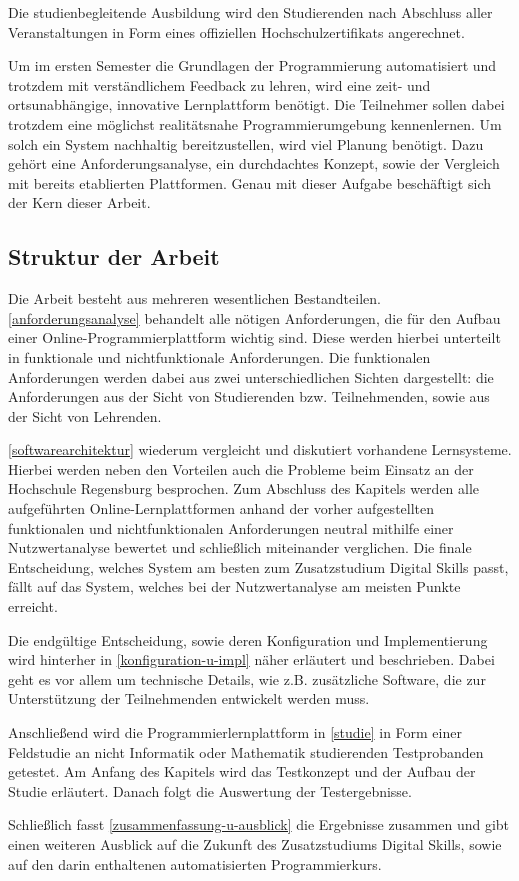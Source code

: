 \newpage

Die studienbegleitende Ausbildung wird den Studierenden nach Abschluss aller
Veranstaltungen in Form eines offiziellen Hochschulzertifikats angerechnet.

Um im ersten Semester die Grundlagen der Programmierung automatisiert und
trotzdem mit verständlichem Feedback zu lehren, wird eine zeit- und
ortsunabhängige, innovative Lernplattform benötigt. Die Teilnehmer sollen dabei
trotzdem eine möglichst realitätsnahe Programmierumgebung kennenlernen. Um solch
ein System nachhaltig bereitzustellen, wird viel Planung benötigt. Dazu gehört
eine Anforderungsanalyse, ein durchdachtes Konzept, sowie der Vergleich
mit bereits etablierten Plattformen. Genau mit dieser Aufgabe beschäftigt sich
der Kern dieser Arbeit.

\subsection{Struktur der Arbeit}\label{struktur-der-arbeit}
Die Arbeit besteht aus mehreren wesentlichen Bestandteilen.
\autoref{anforderungsanalyse} behandelt alle nötigen Anforderungen, die für den
Aufbau einer Online-Programmierplattform wichtig sind. Diese werden hierbei
unterteilt in funktionale und nichtfunktionale Anforderungen. Die funktionalen
Anforderungen werden dabei aus zwei unterschiedlichen Sichten dargestellt: die
Anforderungen aus der Sicht von Studierenden bzw. Teilnehmenden, sowie aus der
Sicht von Lehrenden.

\autoref{softwarearchitektur} wiederum vergleicht und diskutiert vorhandene
Lernsysteme. Hierbei werden neben den Vorteilen auch die Probleme beim Einsatz
an der Hochschule Regensburg besprochen. Zum Abschluss des Kapitels werden alle
aufgeführten Online-Lernplattformen anhand der vorher aufgestellten funktionalen
und nichtfunktionalen Anforderungen neutral mithilfe einer Nutzwertanalyse
bewertet und schließlich miteinander verglichen. Die finale Entscheidung,
welches System am besten zum Zusatzstudium Digital Skills passt, fällt auf das
System, welches bei der Nutzwertanalyse am meisten Punkte erreicht.

Die endgültige Entscheidung, sowie deren Konfiguration und Implementierung wird
hinterher in \autoref{konfiguration-u-impl} näher erläutert und beschrieben.
Dabei geht es vor allem um technische Details, wie z.B. zusätzliche Software,
die zur Unterstützung der Teilnehmenden entwickelt werden muss.

Anschließend wird die Programmierlernplattform in \autoref{studie} in Form
einer Feldstudie an nicht Informatik oder Mathematik studierenden Testprobanden
getestet. Am Anfang des Kapitels wird das Testkonzept und der Aufbau der Studie
erläutert. Danach folgt die Auswertung der Testergebnisse.

Schließlich fasst \autoref{zusammenfassung-u-ausblick} die Ergebnisse
zusammen und gibt einen weiteren Ausblick auf die Zukunft des Zusatzstudiums
Digital Skills, sowie auf den darin enthaltenen automatisierten Programmierkurs.